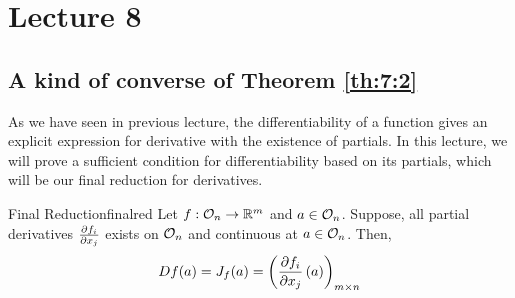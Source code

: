 \documentclass[../Analysis-3.tex]{subfiles}
\begin{document}
\chapter*{Lecture 8} %
\setcounter{chapter}{8} %
\setcounter{section}{0}
\setcounter{equation}{0}
\setcounter{figure}{0}


\section{A kind of converse of Theorem \ref{th:7:2}}

As we have seen in previous lecture, the differentiability of a function gives an explicit expression for derivative with the existence of partials. In this lecture, we will prove a sufficient condition for differentiability based on its partials, which will be our final reduction for derivatives.

\begin{Thm}{Final Reduction}{finalred}
  Let $ f :\mathcal{O}_{n} \to \mathbb{R}^m $ and $ a \in \mathcal{O}_{n} $. Suppose, all partial derivatives $ \pdv{f_i}{x_j} $ exists on $ \mathcal{O}_{n} $ and continuous at $ a \in \mathcal{O}_{n} $. Then,
  \begin{align*}
    Df(a) = J_{f}(a) = \left( \pdv{f_i}{x_j}\left( a \right) \right)_{m \times n}
  \end{align*}
\end{Thm}
\end{document}
